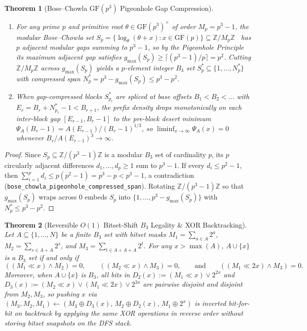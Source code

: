 \documentclass[11pt,a4paper]{article}
\newtheorem{theorem}{Theorem}[section]
\theoremstyle{remark}
\begin{document}
\begin{theorem}[Bose--Chowla $\mathrm{GF}(p^3)$ Pigeonhole Gap Compression]
\begin{enumerate}
  \item For any prime $p$ and primitive root $\theta \in \mathrm{GF}(p^3)^\times$ of order $M_p = p^3 - 1$, the modular Bose--Chowla set $S_p = \{\log_\theta(\theta + x) : x \in \mathrm{GF}(p)\} \subseteq \mathbb{Z}/M_p\mathbb{Z}$~\cite{BoseChowla1962} has $p$ adjacent modular gaps summing to $p^3 - 1$, so by the Pigeonhole Principle its maximum adjacent gap satisfies $g_{\max}(S_p) \ge \lceil (p^3 - 1)/p \rceil = p^2$. Cutting $\mathbb{Z}/M_p\mathbb{Z}$ across $g_{\max}(S_p)$ yields a $p$-element integer $B_3$ set $S_p^* \subseteq \{1, \dots, N_p^*\}$ with compressed span $N_p^* = p^3 - g_{\max}(S_p) \le p^3 - p^2$.
  \item When gap-compressed blocks $S_{p_r}^*$ are spliced at base offsets $B_1 < B_2 < \dots$ with $E_r = B_r + N_{p_r}^* - 1 < B_{r+1}$, the prefix density drops monotonically on each inter-block gap $[E_{r-1}, B_r - 1]$ to the pre-block desert minimum $\Psi_A(B_r - 1) = A(E_{r-1})/(B_r - 1)^{1/3}$, so $\liminf_{x\to\infty} \Psi_A(x) = 0$ whenever $B_r / A(E_{r-1})^3 \to \infty$.
\end{enumerate}
\end{theorem}

\begin{proof}
Since $S_p \subseteq \mathbb{Z}/(p^3-1)\mathbb{Z}$ is a modular $B_3$ set of cardinality $p$, its $p$ circularly adjacent differences $d_1, \dots, d_p \ge 1$ sum to $p^3 - 1$. If every $d_i \le p^2 - 1$, then $\sum_{i=1}^p d_i \le p(p^2 - 1) = p^3 - p < p^3 - 1$, a contradiction (\texttt{bose\_chowla\_pigeonhole\_compressed\_span}). Rotating $\mathbb{Z}/(p^3-1)\mathbb{Z}$ so that $g_{\max}(S_p)$ wraps across $0$ embeds $S_p$ into $\{1, \dots, p^3 - g_{\max}(S_p)\}$ with $N_p^* \le p^3 - p^2$.
\end{proof}

\begin{theorem}[Reversible $O(1)$ Bitset-Shift $B_3$ Legality \& XOR Backtracking]
Let $A \subseteq \{1, \dots, N\}$ be a finite $B_3$ set with bitset masks $M_1 = \sum_{a \in A} 2^a$, $M_2 = \sum_{s \in A+A} 2^s$, and $M_3 = \sum_{t \in A+A+A} 2^t$. For any $x > \max(A)$, $A \cup \{x\}$ is a $B_3$ set if and only if
\[
  ((M_1 \ll x) \wedge M_2) = 0, \qquad ((M_2 \ll x) \wedge M_3) = 0, \qquad \text{and} \qquad ((M_1 \ll 2x) \wedge M_3) = 0.
\]
Moreover, when $A \cup \{x\}$ is $B_3$, all bits in $D_2(x) := (M_1 \ll x) \vee 2^{2x}$ and $D_3(x) := (M_2 \ll x) \vee (M_1 \ll 2x) \vee 2^{3x}$ are pairwise disjoint and disjoint from $M_2, M_3$, so pushing $x$ via $(M_3, M_2, M_1) \leftarrow (M_3 \oplus D_3(x),\, M_2 \oplus D_2(x),\, M_1 \oplus 2^x)$ is inverted bit-for-bit on backtrack by applying the same XOR operations in reverse order without storing bitset snapshots on the DFS stack.
\end{theorem}
\end{document}
